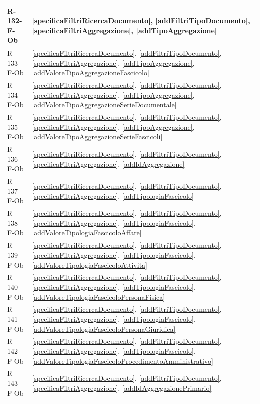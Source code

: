 \begin{longtable}{|p{4cm}|p{10cm}|}
\hline
R-132-F-Ob & \ref{specificaFiltriRicercaDocumento}, \ref{addFiltriTipoDocumento}, \ref{specificaFiltriAggregazione}, \ref{addTipoAggregazione} \\
\hline
R-133-F-Ob & \ref{specificaFiltriRicercaDocumento}, \ref{addFiltriTipoDocumento}, \ref{specificaFiltriAggregazione}, \ref{addTipoAggregazione}, \ref{addValoreTipoAggregazioneFascicolo} \\
\hline
R-134-F-Ob & \ref{specificaFiltriRicercaDocumento}, \ref{addFiltriTipoDocumento}, \ref{specificaFiltriAggregazione}, \ref{addTipoAggregazione}, \ref{addValoreTipoAggregazioneSerieDocumentale} \\
\hline
R-135-F-Ob & \ref{specificaFiltriRicercaDocumento}, \ref{addFiltriTipoDocumento}, \ref{specificaFiltriAggregazione}, \ref{addTipoAggregazione}, \ref{addValoreTipoAggregazioneSerieFascicoli} \\
\hline
R-136-F-Ob & \ref{specificaFiltriRicercaDocumento}, \ref{addFiltriTipoDocumento}, \ref{specificaFiltriAggregazione}, \ref{addIdAggregazione} \\
\hline
R-137-F-Ob & \ref{specificaFiltriRicercaDocumento}, \ref{addFiltriTipoDocumento}, \ref{specificaFiltriAggregazione}, \ref{addTipologiaFascicolo} \\
\hline
R-138-F-Ob & \ref{specificaFiltriRicercaDocumento}, \ref{addFiltriTipoDocumento}, \ref{specificaFiltriAggregazione}, \ref{addTipologiaFascicolo}, \ref{addValoreTipologiaFascicoloAffare} \\
\hline
R-139-F-Ob & \ref{specificaFiltriRicercaDocumento}, \ref{addFiltriTipoDocumento}, \ref{specificaFiltriAggregazione}, \ref{addTipologiaFascicolo}, \ref{addValoreTipologiaFascicoloAttivita} \\
\hline
R-140-F-Ob & \ref{specificaFiltriRicercaDocumento}, \ref{addFiltriTipoDocumento}, \ref{specificaFiltriAggregazione}, \ref{addTipologiaFascicolo}, \ref{addValoreTipologiaFascicoloPersonaFisica} \\
\hline
R-141-F-Ob & \ref{specificaFiltriRicercaDocumento}, \ref{addFiltriTipoDocumento}, \ref{specificaFiltriAggregazione}, \ref{addTipologiaFascicolo}, \ref{addValoreTipologiaFascicoloPersonaGiuridica} \\
\hline
R-142-F-Ob & \ref{specificaFiltriRicercaDocumento}, \ref{addFiltriTipoDocumento}, \ref{specificaFiltriAggregazione}, \ref{addTipologiaFascicolo}, \ref{addValoreTipologiaFascicoloProcedimentoAmministrativo} \\
\hline
R-143-F-Ob & \ref{specificaFiltriRicercaDocumento}, \ref{addFiltriTipoDocumento}, \ref{specificaFiltriAggregazione}, \ref{addIdAggregazionePrimario} \\

\end{longtable}
